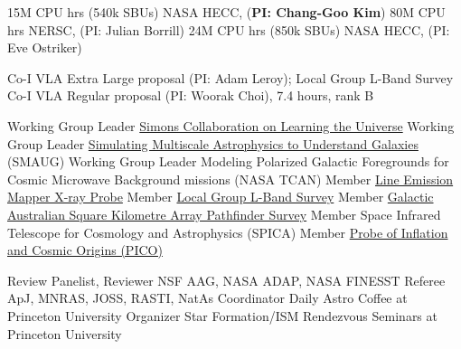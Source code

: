 \documentclass[12pt]{article}
\begin{document}

{15M CPU hrs (540k SBUs)}
{NASA HECC, ({\bf PI: Chang-Goo Kim})}
{80M CPU hrs}
{NERSC, (PI: Julian Borrill)}
{24M CPU hrs (850k SBUs)}
{NASA HECC, (PI: Eve Ostriker)}


{Co-I}
{VLA Extra Large proposal (PI: Adam Leroy); Local Group L-Band Survey}
{Co-I}
{VLA Regular proposal (PI: Woorak Choi), 7.4 hours, rank B}


{Working Group Leader}
{\href{https://www.learning-the-universe.org}{Simons Collaboration on Learning the Universe}}
{Working Group Leader}
{{\href{https://www.simonsfoundation.org/flatiron/center-for-computational-astrophysics/galaxy-formation/smaug/}{Simulating Multiscale Astrophysics to Understand Galaxies} (SMAUG)}}
{Working Group Leader}
{Modeling Polarized Galactic Foregrounds for Cosmic Microwave Background missions (NASA TCAN)}
{Member}
{\href{http://lem.cfa.harvard.edu}{Line Emission Mapper X-ray Probe}}
{Member}
{\href{https://www.lglbs.org}{Local Group L-Band Survey}}
{Member}
{\href{https://gaskap.anu.edu.au}{Galactic Australian Square Kilometre Array Pathfinder Survey}}
{Member}
{Space Infrared Telescope for Cosmology and Astrophysics (SPICA)}
{Member}
{\href{https://zzz.physics.umn.edu/!ipsig/}{Probe of Inflation and Cosmic Origins (PICO)}}


{Review Panelist, Reviewer}
{NSF AAG, NASA ADAP, NASA FINESST}
{Referee}
{ApJ, MNRAS, JOSS, RASTI, NatAs}
{Coordinator}
{Daily Astro Coffee at Princeton University}
{Organizer}
{Star Formation/ISM Rendezvous Seminars at Princeton University}
\end{document}
